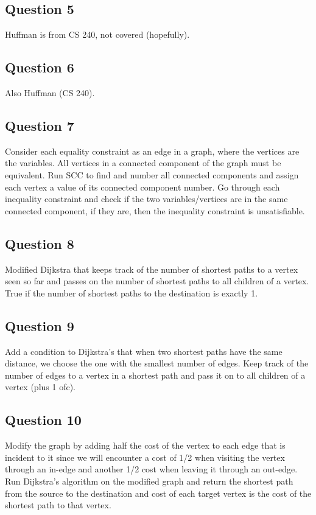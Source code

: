 \documentclass[11pt]{article}
\begin{document}
\subsection{Question 5}

Huffman is from CS 240, not covered (hopefully).

\subsection{Question 6}

Also Huffman (CS 240).

\subsection{Question 7}

Consider each equality constraint as an edge in a graph, where the vertices are the variables. All vertices in a connected component of the graph must be equivalent. Run SCC to find and number all connected components and assign each vertex a value of its connected component number. Go through each inequality constraint and check if the two variables/vertices are in the same connected component, if they are, then the inequality constraint is unsatisfiable.

\subsection{Question 8}

Modified Dijkstra that keeps track of the number of shortest paths to a vertex seen so far and passes on the number of shortest paths to all children of a vertex. True if the number of shortest paths to the destination is exactly 1.

\subsection{Question 9}

Add a condition to Dijkstra's that when two shortest paths have the same distance, we choose the one with the smallest number of edges. Keep track of the number of edges to a vertex in a shortest path and pass it on to all children of a vertex (plus 1 ofc).

\subsection{Question 10}

Modify the graph by adding half the cost of the vertex to each edge that is incident to it since we will encounter a cost of 1/2 when visiting the vertex through an in-edge and another 1/2 cost when leaving it through an out-edge. Run Dijkstra's algorithm on the modified graph and return the shortest path from the source to the destination and cost of each target vertex is the cost of the shortest path to that vertex.
\end{document}
